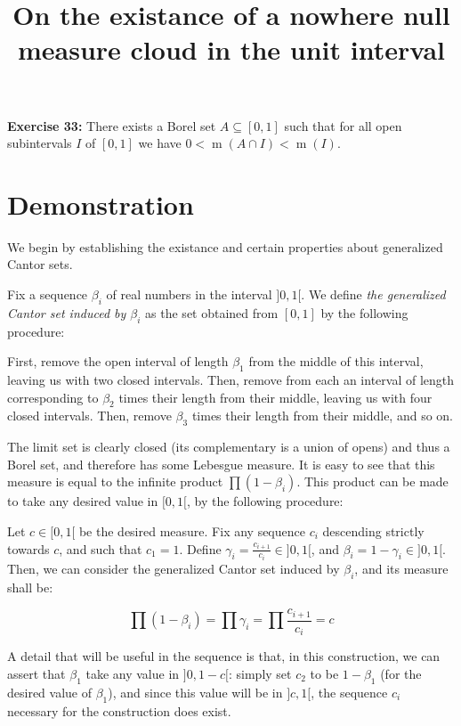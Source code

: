\documentclass{article}
\title{On the existance of a nowhere null measure cloud in the unit interval}
\author{}
\date{}
\DeclareMathOperator{\m}{m}
\begin{document}
	\maketitle
	
	\textbf{Exercise 33:} There exists a Borel set $A \subseteq [0,1]$ such that for all open subintervals $I$ of $[0,1]$ we have $0 < \m(A \cap I) < \m(I)$.
	
	\bigskip
	
	\section{Demonstration}
	
	We begin by establishing the existance and certain properties about generalized Cantor sets.
	
	Fix a sequence $\beta_i$ of real numbers in the interval $]0,1[$. We define \emph{the generalized Cantor set induced by $\beta_i$} as the set obtained from $[0,1]$ by the following procedure:
	
	First, remove the open interval of length $\beta_1$ from the middle of this interval, leaving us with two closed intervals. Then, remove from each an interval of length corresponding to $\beta_2$ times their length from their middle, leaving us with four closed intervals. Then, remove $\beta_3$ times their length from their middle, and so on.
	
	The limit set is clearly closed (its complementary is a union of opens) and thus a Borel set, and therefore has some Lebesgue measure. It is easy to see that this measure is equal to the infinite product $\prod (1 - \beta_i)$. This product can be made to take any desired value in $[0, 1[$, by the following procedure:
	
	Let $c \in [0, 1[$ be the desired measure. Fix any sequence $c_i$ descending strictly towards $c$, and such that $c_1 = 1$. Define $\gamma_i = \frac{c_{i+1}}{c_i} \in ]0, 1[$, and $\beta_i = 1 - \gamma_i \in ]0,1[$. Then, we can consider the generalized Cantor set induced by $\beta_i$, and its measure shall be:
	
	\[ \prod (1 - \beta_i) = \prod \gamma_i = \prod \frac{c_{i+1}}{c_i} = c \]
	
	A detail that will be useful in the sequence is that, in this construction, we can assert that $\beta_1$ take any value in $]0, 1-c[$: simply set $c_2$ to be $1 - \beta_1$ (for the desired value of $\beta_1$), and since this value will be in $]c, 1[$, the sequence $c_i$ necessary for the construction does exist.
	
\end{document}
